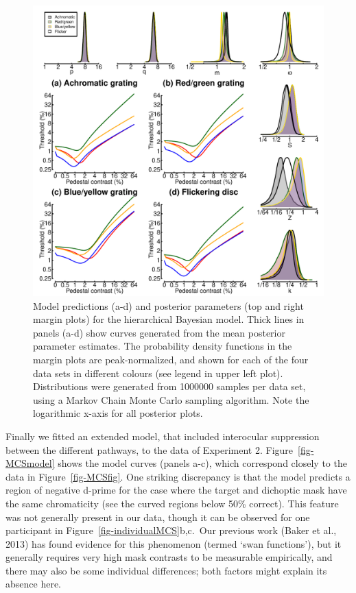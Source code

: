 \documentclass[
  letterpaper,
  DIV=11,
  numbers=noendperiod]{scrartcl}
\begin{document}
\begin{figure}

{\centering \includegraphics{Figures/stanoutput.pdf}

}

\caption{\label{fig-bayesianmodel}Model predictions (a-d) and posterior
parameters (top and right margin plots) for the hierarchical Bayesian
model. Thick lines in panels (a-d) show curves generated from the mean
posterior parameter estimates. The probability density functions in the
margin plots are peak-normalized, and shown for each of the four data
sets in different colours (see legend in upper left plot). Distributions
were generated from 1000000 samples per data set, using a Markov Chain
Monte Carlo sampling algorithm. Note the logarithmic x-axis for all
posterior plots.}

\end{figure}

Finally we fitted an extended model, that included interocular
suppression between the different pathways, to the data of Experiment 2.
Figure~\ref{fig-MCSmodel} shows the model curves (panels a-c), which
correspond closely to the data in Figure~\ref{fig-MCSfig}. One striking
discrepancy is that the model predicts a region of negative d-prime for
the case where the target and dichoptic mask have the same chromaticity
(see the curved regions below 50\% correct). This feature was not
generally present in our data, though it can be observed for one
participant in Figure~\ref{fig-individualMCS}b,c.~Our previous work
(Baker et al., 2013) has found evidence for this phenomenon (termed
`swan functions'), but it generally requires very high mask contrasts to
be measurable empirically, and there may also be some individual
differences; both factors might explain its absence here.
\end{document}
